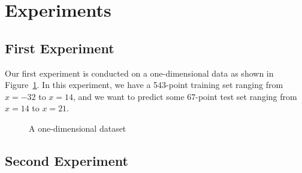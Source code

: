 \section{Experiments} \label{sec:experiment}

\subsection{First Experiment}
Our first experiment is conducted on a one-dimensional data as shown in Figure~\ref{fig:data1}. In this experiment, we have a 543-point training set ranging from $x = -32$ to $x = 14$, and we want to predict some 67-point test set ranging from $x = 14$ to $x = 21$.


\begin{figure}[htp]
\begin{minipage}[htp]{1\linewidth}
	\centering
\caption{A one-dimensional dataset}
\label{fig:data1} %
\end{minipage}
\vspace{-0.05in}
\end{figure}






\subsection{Second Experiment}

